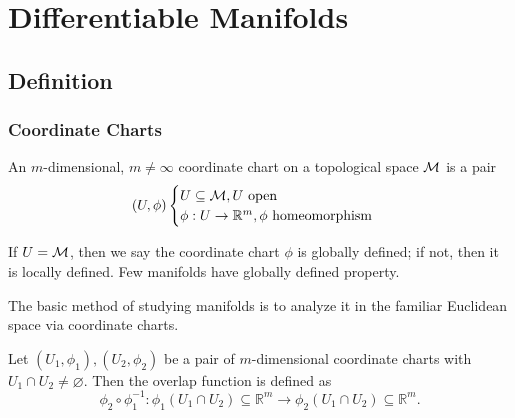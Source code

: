 \documentclass[../main.tex]{subfiles}
\begin{document}
    \section{Differentiable Manifolds}
    \subsection{Definition}
    \subsubsection{Coordinate Charts}
    \begin{definition}\label{def:coordinate-charts}
        An \(m\)-dimensional, \(m \neq \infty\) coordinate chart on a topological 
        space \(\manifold\) is a pair 
        \[
        (U, \phi)
        \begin{cases}
            U \subseteq \manifold[M], U~\text{open}\\
            \phi : U \to \mathbb{R}^{m}, \phi~\text{homeomorphism}
        \end{cases}
        \]
        \begin{center}
            
        \end{center}
    \end{definition}
    \begin{remark}
        If \(U=\manifold[M]\), then we say the coordinate chart \(\phi\) is 
        globally defined; if not, then it is locally defined. Few manifolds 
        have globally defined property.
    \end{remark}
    \begin{remark}
        The basic method of studying manifolds is to analyze it in the familiar 
        Euclidean space via coordinate charts.
    \end{remark}
    \newpage
    \begin{definition}\label{def:overlap-function}
        Let \((U_1, \phi_1), (U_2, \phi_2)\) be a pair of \(m\)-dimensional 
        coordinate charts with \\\(U_1 \cap U_2 \neq \varnothing\). Then the 
        overlap function is defined as 
        \[
        \phi_2\circ\phi_1 ^{-1} : \phi_1(U_1 \cap U_2) \subseteq \mathbb{R}^m 
        \to \phi_2(U_1 \cap U_2) \subseteq \mathbb{R}^m.
        \]
        \begin{center}
            
        \end{center}
    \end{definition}
\end{document}
